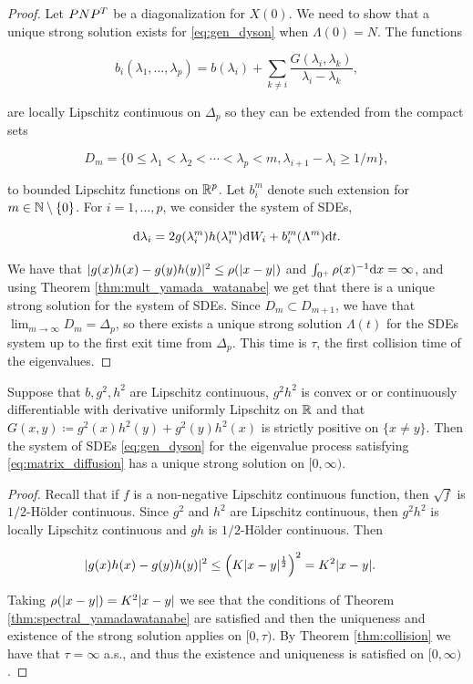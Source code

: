 \begin{proof}
    Let $PN P^T$ be a diagonalization for $X(0)$. We need to show that a unique strong solution exists for \eqref{eq:gen_dyson} when $\Lambda(0)=N$. The functions
    
    \[ b_i(\lambda_1, \dots,\lambda_p) = b(\lambda_i) + \sum_{k \neq i} \frac{G(\lambda_i,\lambda_k)}{\lambda_i - \lambda_k}, \]

    \noindent are locally Lipschitz continuous on $\Delta_p$ so they can be extended from the compact sets 

    \[ D_m = \{ 0 \le \lambda_1 < \lambda_2 < \cdots < \lambda_p < m, \lambda_{i+1} - \lambda_i \ge 1/m \}, \]

    \noindent to bounded Lipschitz functions on $\mathbb R^p$. Let $b_i^m$ denote such extension for $m \in \mathbb N \setminus \{0\}$. For $i = 1, \dots, p$, we consider the system of SDEs,

    \[ \mathrm d \lambda_i = 2g(\lambda_i^m)h(\lambda_i^m)\mathrm d W_i + b_i^m(\Lambda^m) \mathrm d t. \]

    We have that $\lvert g(x)h(x) - g(y)h(y) \rvert^2 \le \rho(\lvert x-y \rvert)$ and $\int_{0^+} \rho(x)^{-1}\mathrm d x=\infty$, and using Theorem \ref{thm:mult_yamada_watanabe} we get that there is a unique strong solution for the system of SDEs. Since $D_m \subset D_{m+1}$, we have that $\lim_{m\to\infty} D_m = \Delta_p$, so there exists a unique strong solution $\Lambda(t)$ for the SDEs system up to the first exit time from $\Delta_p$. This time is $\tau$, the first collision time of the eigenvalues.

\end{proof}

\begin{corollary}
    Suppose that $b, g^2, h^2$ are Lipschitz continuous, $g^2h^2$ is convex or or continuously differentiable with derivative uniformly Lipschitz on $\mathbb R$ and that $G(x,y) \coloneqq g^2(x)h^2(y) + g^2(y)h^2(x)$ is strictly positive on $\{x \neq y\}$. Then the system of SDEs \eqref{eq:gen_dyson} for the eigenvalue process satisfying \eqref{eq:matrix_diffusion} has a unique strong solution on $[0,\infty)$.
\end{corollary}

\begin{proof}
    Recall that if $f$ is a non-negative Lipschitz continuous function, then $\sqrt f$ is $1/2$-Hölder continuous. Since $g^2$ and $h^2$ are Lipschitz continuous, then $g^2h^2$ is locally Lipschitz continuous and $gh$ is $1/2$-Hölder continuous. Then

    \begin{align*}
        \lvert g(x)h(x) - g(y)h(y) \rvert^2 &\le \left( K\lvert x-y \rvert^{\frac12} \right)^2 = K^2 \lvert x-y \rvert.
    \end{align*}

    Taking $\rho(|x-y|) = K^2\lvert x-y \rvert$ we see that the conditions of Theorem \ref{thm:spectral_yamadawatanabe} are satisfied and then the uniqueness and existence of the strong solution applies on $[0,\tau)$. By Theorem \ref{thm:collision} we have that $\tau=\infty$ a.s., and thus the existence and uniqueness is satisfied on $[0,\infty)$.
\end{proof}




